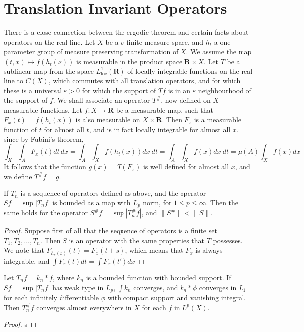 \chapter{Translation Invariant Operators}

There is a close connection between the ergodic theorem and certain facts about operators on the real line. Let $X$ be a $\sigma$-finite measure space, and $h_t$ a one parameter group of measure preserving transformation of $X$. We assume the map $(t,x) \mapsto f(h_t(x))$ is measurable in the product space $\mathbf{R} \times X$. Let $T$ be a sublinear map from the space $L^1_{\text{loc}}(\mathbf{R})$ of locally integrable functions on the real line to $C(X)$, which commutes with all translation operators, and for which these is a universal $\varepsilon > 0$ for which the support of $Tf$ is in an $\varepsilon$ neighbourhood of the support of $f$. We shall associate an operator $T^\#$, now defined on $X$-measurable functions. Let $f: X \to \mathbf{R}$ be a measurable map, such that $F_x(t) = f(h_t(x))$ is also measurable on $X \times \mathbf{R}$. Then $F_x$ is a measurable function of $t$ for almost all $t$, and is in fact locally integrable for almost all $x$, since by Fubini's theorem,
%
\[ \int_X \int_A F_x(t) dt\ dx = \int_A \int_X f(h_t(x)) dx\ dt = \int_A \int_X f(x) dx\ dt = \mu(A) \int_X f(x) dx \]
%
It follows that the function $g(x) = T(F_x)$ is well defined for almost all $x$, and we define $T^\# f = g$.

\begin{theorem}
    If $T_n$ is a sequence of operators defined as above, and the operator $Sf = \sup |T_n f|$ is bounded as a map with $L_p$ norm, for $1 \leq p \leq \infty$. Then the same holds for the operator $S^\# f = \sup |T_n^\# f|$, and $\| S^\# \| < \| S \|$.
\end{theorem}
\begin{proof}
    Suppose first of all that the sequence of operators is a finite set $T_1,T_2, \dots, T_n$. Then $S$ is an operator with the same properties that $T$ possesses. We note that $F_{h_s(x)}(t) = F_x(t + s)$, which means that $F_x$ is always integrable, and $\int F_x(t) dt = \int F_x(t') dx$
\end{proof}

\begin{lemma}
    Let $T_n f = k_n * f$, where $k_n$ is a bounded function with bounded support. If $Sf = \sup |T_n f|$ has weak type in $L_p$, $\int k_n$ converges, and $k_n * \phi$ converges in $L_1$ for each infinitely differentiable $\phi$ with compact support and vanishing integral. Then $T_n^\# f$ converges almost everywhere in $X$ for each $f$ in $L^p(X)$.
\end{lemma}
\begin{proof}
    s
\end{proof}

